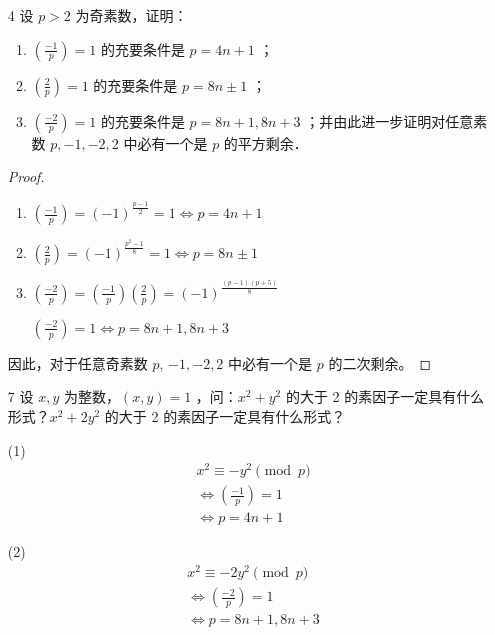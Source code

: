 \begin{enumerate}
    \item[4] 设 $p>2$ 为奇素数，证明：
    \begin{enumerate}
        \item $\left(\frac{-1}{p}\right)=1$ 的充要条件是 $p=4 n+1$ ；
        \item $\left(\frac{2}{p}\right)=1$ 的充要条件是 $p=8 n \pm 1$ ；
        \item $\left(\frac{-2}{p}\right)=1$ 的充要条件是 $p=8 n+1,8 n+3$ ；并由此进一步证明对任意素数 $p,-1,-2,2$ 中必有一个是 $p$ 的平方剩余．
    \end{enumerate}

    \begin{proof}
        \begin{enumerate}
            \item $\left(\frac{-1}{p}\right) = (-1)^{\frac{p-1}{2}} = 1 \Leftrightarrow p = 4n+1$
        
            \item $\left(\frac{2}{p}\right) = (-1)^{\frac{p^2-1}{8}} = 1 \Leftrightarrow p = 8n \pm 1$
    
            \item  $\left(\frac{-2}{p}\right) = \left(\frac{-1}{p}\right)\left(\frac{2}{p}\right) = (-1)^{\frac{(p-1)(p+5)}{8}}$
        
            $\left(\frac{-2}{p}\right) = 1 \Leftrightarrow p = 8n+1, 8n+3$
        \end{enumerate} 
        因此，对于任意奇素数 $p$, $-1, -2, 2$ 中必有一个是 $p$ 的二次剩余。
    \end{proof}

    \item[7] 设 $x, y$ 为整数，$(x, y)=1$ ，问：$x^2+y^2$ 的大于 2 的素因子一定具有什么形式？$x^2+2 y^2$ 的大于 2 的素因子一定具有什么形式？

\begin{solution}
    (1)
\begin{align*}
    & x^2 \equiv -y^2 \pmod{p}\\
    &\Leftrightarrow \left(\frac{-1}{p}\right) = 1\\
    &\Leftrightarrow p = 4n+1
\end{align*}

(2)
\begin{align*}
    & x^2 \equiv -2y^2 \pmod{p}\\
    &\Leftrightarrow \left(\frac{-2}{p}\right) = 1\\
    &\Leftrightarrow p = 8n+1, 8n+3
\end{align*}
\end{solution}
\end{enumerate}